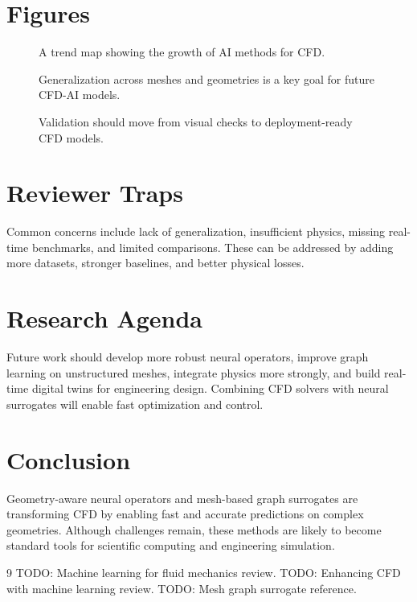 \documentclass[11pt]{article}
\begin{document}
\section{Figures}
\begin{figure}[t]
\centering
{}
\caption{A trend map showing the growth of AI methods for CFD.}
\end{figure}

\begin{figure}[t]
\centering
{}
\caption{Generalization across meshes and geometries is a key goal for future CFD-AI models.}
\end{figure}

\begin{figure}[t]
\centering
{}
\caption{Validation should move from visual checks to deployment-ready CFD models.}
\end{figure}

\section{Reviewer Traps}
Common concerns include lack of generalization, insufficient physics, missing real-time benchmarks, and limited comparisons. These can be addressed by adding more datasets, stronger baselines, and better physical losses.

\section{Research Agenda}
Future work should develop more robust neural operators, improve graph learning on unstructured meshes, integrate physics more strongly, and build real-time digital twins for engineering design. Combining CFD solvers with neural surrogates will enable fast optimization and control.

\section{Conclusion}
Geometry-aware neural operators and mesh-based graph surrogates are transforming CFD by enabling fast and accurate predictions on complex geometries. Although challenges remain, these methods are likely to become standard tools for scientific computing and engineering simulation.

\begin{thebibliography}{9}
 TODO: Machine learning for fluid mechanics review.
 TODO: Enhancing CFD with machine learning review.
 TODO: Mesh graph surrogate reference.
\end{thebibliography}
\end{document}
